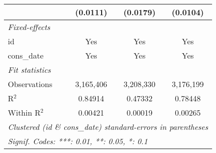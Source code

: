 \begin{tabular}{lccc}
                                                             & (0.0111)        & (0.0179)       & (0.0104)\\
   \midrule \emph{Fixed-effects} &   &   &  \\
   id                                                        & Yes             & Yes            & Yes\\
   cons\_date                                               & Yes             & Yes            & Yes\\
   \midrule \emph{Fit statistics} &   &   &  \\
   Observations                                              & 3,165,406       & 3,208,330      & 3,176,199\\
   R$^2$                                                     & 0.84914         & 0.47332        & 0.78448\\
   Within R$^2$                                              & 0.00421         & 0.00019        & 0.00265\\
   \midrule\midrule\multicolumn{4}{l}{\emph{Clustered (id \& cons\_date) standard-errors in parentheses}}\\
   \multicolumn{4}{l}{\emph{Signif. Codes: ***: 0.01, **: 0.05, *: 0.1}}\\
\end{tabular}



